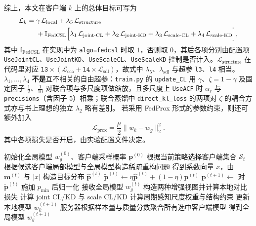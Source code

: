 \documentclass{article}
\begin{document}
综上，本文在客户端 $k$ 上的总体目标可写为
\begin{equation}
\begin{aligned}
\mathcal{L}_k ={}& \gamma\,\mathcal{L}_{\text{local}}
+ \lambda_5\,\mathcal{L}_{\text{structure}} \\
&+ \mathbb{I}_{\text{FedCSL}}\Bigl[
\lambda_1\,\mathcal{L}_{\text{joint-CL}}
+ \lambda_2\,\mathcal{L}_{\text{joint-KD}}
+ \lambda_3\,\mathcal{L}_{\text{scale-CL}}
+ \lambda_4\,\mathcal{L}_{\text{scale-KD}}
\Bigr],
\end{aligned}
\end{equation}
其中 $\mathbb{I}_{\text{FedCSL}}$ 在实现中为 \texttt{algo=fedcsl} 时取 $1$，否则取 $0$，其后各项分别由配置项 \texttt{UseJointCL}、\texttt{UseJointKD}、\texttt{UseScaleCL}、\texttt{UseScaleKD} 控制是否计入。$\mathcal{L}_{\text{structure}}$ 在代码里对应 $\texttt{l3}\times(\mathcal{L}_{\text{cca}}+\texttt{l4}\times\mathcal{L}_{\text{sdl}})$，故式中 $\lambda_5$、$\lambda_{\text{sdl}}$ 与超参 \texttt{l3}、\texttt{l4} 相当。$\lambda_1,\ldots,\lambda_4$ \textbf{不是}互不相关的自由超参：\texttt{train.py} 的 \texttt{update\_CL} 用 $\gamma$、$\zeta=1-\gamma$ 及固定因子 $\frac12$、$\frac{1}{10}$ 对联合项与多尺度项做缩放，且多尺度上 \texttt{UseACF} 时 $\alpha_r$ 与 \texttt{precisions}（含因子 $5$）相乘；联合蒸馏中 \texttt{direct\_kl\_loss} 的两项对 $\zeta$ 的耦合方式亦与书上理想的独立 $\lambda_2$ 略有差别。
若采用 FedProx 形式的参数约束\cite{fedprox}，则还可额外加入
\begin{equation}
\mathcal{L}_{\text{prox}} = \frac{\mu}{2}\|w_k-w_g\|_2^2.
\end{equation}
其中各项损失是否开启，由实验配置文件决定。

\begin{algorithm}[H]
\caption{FedCSL 训练流程}
\label{alg:fedcsl}
\begin{algorithmic}[1]
\State 初始化全局模型 $w_g^{(0)}$、客户端采样概率 $\bm{p}^{(0)}$
    \State 根据当前策略选择客户端集合 $\mathcal{S}_t$
        \State 根据候选客户端局部模型与全局模型构造稀疏重构问题
        \State 得到系数向量 $x$，由 $\bm{m}^{(t)}$ 与 $|x|$ 构造目标分布 $\hat{\bm{p}}^{(t)}$
        \State $\tilde{\bm{p}}^{(t)}\leftarrow \eta\hat{\bm{p}}^{(t)}+(1-\eta)\bm{p}^{(t)}$ 
        \State $\bm{p}^{(t+1)}\leftarrow$ 对 $\tilde{\bm{p}}^{(t)}$ 施加 $p_{\min}$ 后归一化
    \EndIf
        \State 接收全局模型 $w_g^{(t)}$
        \State 构造两种增强视图并计算本地对比损失
        \State 计算 joint CL/KD 与 scale CL/KD
        \State 计算周期感知尺度权重与结构约束
        \State 更新本地模型 $w_k^{(t+1)}$
    \EndFor
    \State 服务器根据样本量与质量分数聚合所有选中客户端模型
    \State 得到全局模型 $w_g^{(t+1)}$
\EndFor
\end{algorithmic}
\end{algorithm}
\end{document}

